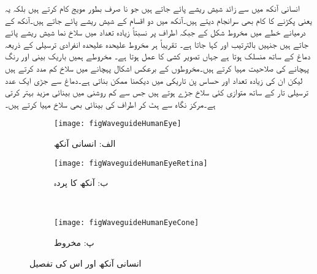 انسانی آنکھ میں  سے زائد شیش ریشے پائے جاتے ہیں جو نا صرف بطور مویج کام کرتے ہیں بلکہ یہ  یعنی  پکڑنے کا کام بھی سرانجام دیتے ہیں۔آنکھ میں دو اقسام کے شیش ریشے پائے جاتے ہیں۔آنکھ کے درمیانے خطے میں مخروط شکل کے  جبکہ اطراف پر نسبتاً زیادہ تعداد میں سلاخ نما شیش ریشے پائے جاتے ہیں جنہیں بالترتیب  اور   کہا جاتا ہے۔ تقریباً ہر مخروط علیحدہ علیحدہ انفرادی ترسیلی  کے ذریعہ دماغ کے ساتھ منسلک ہوتا ہے جہاں تصویر کشی کا عمل ہوتا ہے۔ مخروطے ہمیں باریک بینی اور رنگ پہچانے کی صلاحیت مہیا کرتے ہیں۔مخروطوں کے برعکس اشکال پہچانے میں سلاخ کم مدد کرتے ہیں لیکن ان کی زیادہ تعداد اور حساس پن  تاریکی میں دیکھنا ممکن بناتی ہے۔دماغ سے جڑی ایک عدد ترسیلی تار کے ساتھ متوازی کئی سلاخ جڑے ہوتے ہیں جس سے کم روشنی میں بینائی مزید بہتر کرتی ہے۔مرکز نگاہ سے ہٹ کر اطراف کی بینائی بھی سلاخ مہیا کرتے ہیں۔  

\begin{figure}
\centering
\begin{subfigure}{0.4\textwidth}
\centering
\texttt{[image: figWaveguideHumanEye]}
\caption*{الف: انسانی آنکھ}
\label{شکل_مویج_انسانی_آنکھ_مکمل_شکل}
\end{subfigure}%
\begin{subfigure}{0.4\textwidth}
\centering
\texttt{[image: figWaveguideHumanEyeRetina]}
\caption*{ب: آنکھ کا پردہ}
\label{شکل_مویج_انسانی_آنکھ_کا_پردہ}
\end{subfigure}%
\\
\begin{subfigure}{0.4\textwidth}
\centering
\texttt{[image: figWaveguideHumanEyeCone]}
\caption*{پ: مخروط}
\label{شکل_مویج_انسانی_آنکھ_مخروط}
\end{subfigure}%
\caption{انسانی آنکھ اور اس کی تفصیل}
\label{شکل_مویج_انسانی_آنکھ}
\end{figure}

